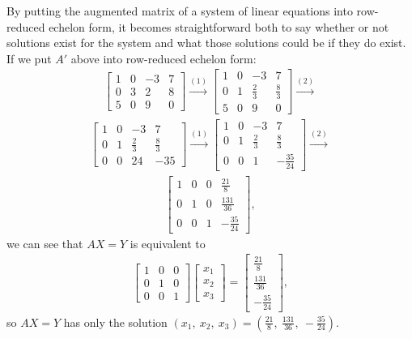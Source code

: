 \documentclass[12pt]{article}
\begin{document}
\begin{comm}
  By putting the augmented matrix of a system of linear equations
  into row-reduced echelon form, it becomes straightforward both
  to say whether or not solutions exist for the system and what
  those solutions could be if they do exist. If we put $A'$ above
  into row-reduced echelon form:
  \begin{align*}
    \begin{bmatrix}
      1 & 0 & -3 & 7\\
      0 & 3 &  2 & 8\\
      5 & 0 &  9 & 0
    \end{bmatrix}
    \xrightarrow{(1)}
    \begin{bmatrix}
      1 & 0 & -3 & 7\\
      0 & 1 &  \frac{2}{3} & \frac{8}{3}\\
      5 & 0 &  9 & 0
    \end{bmatrix}
    \xrightarrow{(2)}
  \end{align*}
  \begin{align*}
    \begin{bmatrix}
      1 & 0 & -3 & 7\\
      0 & 1 &  \frac{2}{3} & \frac{8}{3}\\
      0 & 0 & 24 & -35
    \end{bmatrix}
    \xrightarrow{(1)}
    \begin{bmatrix}
      1 & 0 & -3 & 7\\
      0 & 1 &  \frac{2}{3} & \frac{8}{3}\\
      0 & 0 & 1 & -\frac{35}{24}
    \end{bmatrix}
    \xrightarrow{(2)}
  \end{align*}
  \begin{align*}
    \begin{bmatrix}
      1 & 0 & 0 & \frac{21}{8}\\
      0 & 1 & 0 & \frac{131}{36}\\
      0 & 0 & 1 & -\frac{35}{24}
    \end{bmatrix},
  \end{align*}
  we can see that $AX = Y$ is equivalent to
  \begin{align*}
    \begin{bmatrix}
      1 & 0 & 0\\
      0 & 1 & 0\\
      0 & 0 & 1
    \end{bmatrix}
    \begin{bmatrix}
      x_1\\
      x_2\\
      x_3
    \end{bmatrix}
    =
    \begin{bmatrix}
      \frac{21}{8}\\
      \frac{131}{36}\\
      -\frac{35}{24}
    \end{bmatrix},
  \end{align*}
  so $AX = Y$ has only the solution $(x_1,\ x_2,\ x_3) =
  (\frac{21}{8},\ \frac{131}{36},\ -\frac{35}{24})$.


\end{comm}
\end{document}
